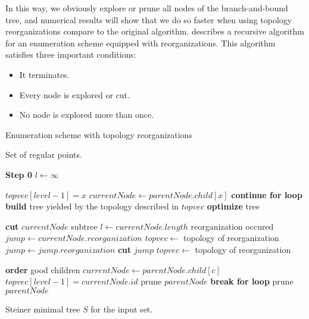 \documentclass{article}
\theoremstyle{plain}
\begin{document}
In this way, we obviously explore or prune all nodes of the \mbox{branch-and-bound} tree, and numerical results will show that we do so faster when using topology reorganizations compare to the original algorithm.
 describes a recursive algorithm for an enumeration scheme equipped with reorganizations. 
This algorithm satisfies three important conditions:
\begin{itemize}
\item It terminates.
\item Every node is explored or cut.
\item No node is explored more than once.
\end{itemize}



\begin{algorithm}
\renewcommand{\algorithmicrequire}{\textbf{Input:}}
\renewcommand{\algorithmicensure}{\textbf{Output:}}

\caption{Enumeration scheme with topology reorganizations}
\label{OES}

\begin{algorithmic}[1]
\Require Set of regular points.
\Statex\hrulefill

\Statex \textbf{Step 0} $l \gets \infty$
\State {}

\Statex 
{}
		\State $topvec[level-1] = x$
		\State $currentNode \gets parentNode.child[x]$
			\State \textbf{continue for loop}
		\EndIf
		\State \textbf{build} tree yielded by the topology described in $topvec$
		\State \textbf{optimize} tree \label{lin:ch}
		
		
				\State \textbf{cut} $currentNode$ subtree
				\State $l\gets currentNode.length$
			\EndIf
		\Else \Comment reorganization occured
			\State $jump \gets currentNode.reorganization$
			\State $topvec \gets$ topology of reorganization
			\State {}
				\State $jump \gets jump.reorganization$
					\State \textbf{cut} $jump$
				\Else
					\State $topvec \gets$ topology of reorganization
					\State {}
				\EndIf
			\EndIf
		\EndIf
	\EndFor
	
		\State \textbf{order} good children
			\State $currentNode \gets parentNode.child[c]$
				\State $topvec[level-1] = currentNode.id$
				\State {}		
			\Else
				\State prune $parentNode$
				\State \textbf{break for loop}
			\EndIf
		\EndFor
	\Else
		\State prune $parentNode$
	\EndIf
\EndProcedure

\hrulefill
\Ensure Steiner minimal tree $S$ for the input set.

\end{algorithmic}

\end{algorithm}
\end{document}
